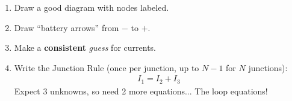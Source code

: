 \documentclass[aspectratio=169,
hyperref={colorlinks,urlcolor=blue}
]{beamer}
\begin{document}
{
\begin{enumerate}
\item Draw a good diagram with nodes labeled.
\item<2-> Draw ``battery arrows'' from $-$ to $+$.
\item<3-> Make a \textbf{consistent} \emph{guess} for currents.
\item<10-> Write the Junction Rule (once per junction, up to $N-1$ for $N$ junctions):
\begin{align*}
\boxed{I_1=I_2+I_3}
\end{align*}
Expect 3 unknowns, so need 2 more equations... The loop equations!
\end{enumerate}

}
\end{document}

